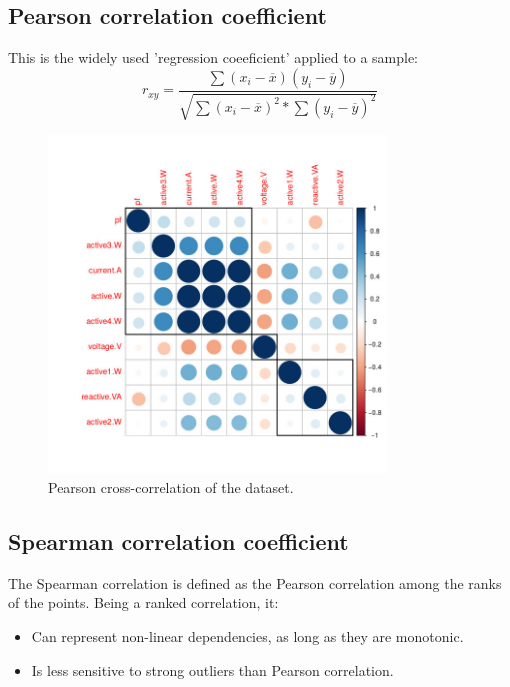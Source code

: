 \documentclass[11pt]{article}
\begin{document}
\subsection{Pearson correlation coefficient}
This is the widely used 'regression coeeficient'\cite{q8} applied to a sample:
$$ r_{xy} = \frac{\sum(x_i - \overline{x})(y_i - \overline{y})}
                 {\sqrt{\sum(x_i - \overline{x})^2*\sum(y_i - \overline{y})^2}} $$
\begin{figure}[!htp]
  \centering
    \includegraphics[width=0.8\textwidth]{img/pearson}
    \caption{Pearson cross-correlation of the dataset.}
\end{figure}

\subsection{Spearman correlation coefficient}
The Spearman correlation is defined as the Pearson correlation among the ranks of the points.
Being a ranked correlation, it: 
\begin{itemize}
    \item{Can represent non-linear dependencies, as long as they are monotonic.\cite{q9}}
    \item{Is less sensitive to strong outliers than Pearson correlation\cite{q4}\cite{q9}.}
\end{itemize}
\end{document}
